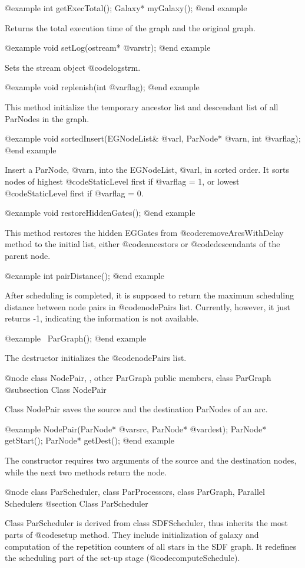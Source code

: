 @example
int getExecTotal();
Galaxy* myGalaxy();
@end example

Returns the total execution time of the graph and the original graph.

@example
void setLog(ostream* @var{str});
@end example

Sets the stream object @code{logstrm}.

@example
void replenish(int @var{flag});
@end example

This method initialize the temporary ancestor list and descendant list
of all ParNodes in the graph.

@example
void sortedInsert(EGNodeList& @var{l}, ParNode* @var{n}, int @var{flag});
@end example

Insert a ParNode, @var{n}, into the EGNodeList, @var{l}, in sorted order.
It sorts nodes of highest @code{StaticLevel} first if @var{flag} = 1,
or lowest @code{StaticLevel} first if @var{flag} = 0.

@example
void restoreHiddenGates();
@end example

This method restores the hidden EGGates from @code{removeArcsWithDelay} 
method to the initial list, either @code{ancestors} or @code{descendants}
of the parent node.

@example
int pairDistance();
@end example

After scheduling is completed, it is supposed to return the
maximum scheduling distance between node pairs in @code{nodePairs} list.
Currently, however, it just returns -1, indicating the information
is not available.

@example
~ParGraph();
@end example

The destructor initializes the @code{nodePairs} list.

@node class NodePair, , other ParGraph public members, class ParGraph
@subsection Class NodePair

Class NodePair saves the source and the destination ParNodes of an arc.

@example
NodePair(ParNode* @var{src}, ParNode* @var{dest});
ParNode* getStart();
ParNode* getDest();
@end example

The constructor requires two arguments of the source and the destination
nodes, while the next two methods return the node.

@node class ParScheduler, class ParProcessors, class ParGraph, Parallel Schedulers
@section Class ParScheduler

Class ParScheduler is derived from class SDFScheduler, thus inherits the most
parts of @code{setup} method. They include initialization of galaxy and
computation of the repetition counters of all stars in the SDF graph.
It redefines the scheduling part of the set-up stage (@code{computeSchedule}).

